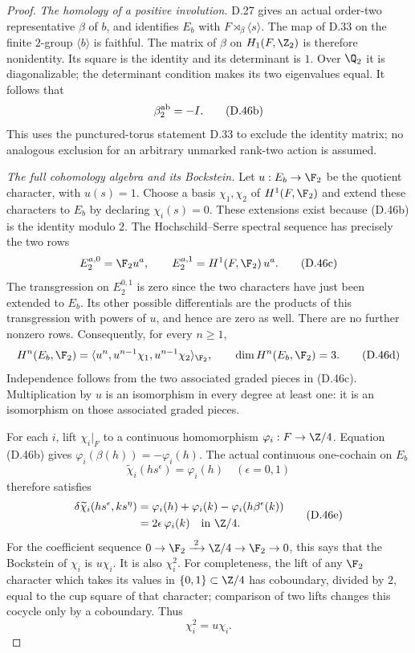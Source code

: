 \begin{proof}
\emph{The homology of a positive involution.}
D.27 gives an actual order-two representative $\beta$
of $b$, and identifies $E_b$ with
$F\rtimes_\beta\langle s\rangle$.
The map of D.33 on the finite $2$-group $\langle b\rangle$
is faithful.  The matrix of $\beta$ on
$H_1(F,\Z_2)$ is therefore nonidentity.
Its square is the identity and its determinant is $1$.
Over $\Q_2$ it is diagonalizable; the determinant
condition makes its two eigenvalues equal.
It follows that
\[
                    \beta^{\rm ab}_2=-I.               \tag{D.46b}
\]
This uses the punctured-torus statement D.33 to exclude
the identity matrix; no analogous exclusion for an
arbitrary unmarked rank-two action is assumed.

\emph{The full cohomology algebra and its Bockstein.}
Let $u:E_b\to\F_2$ be the quotient character, with
$u(s)=1$.  Choose a basis $\chi_1,\chi_2$ of
$H^1(F,\F_2)$ and extend these characters to $E_b$
by declaring $\chi_i(s)=0$.
These extensions exist because (D.46b) is the identity
modulo $2$.
The Hochschild--Serre spectral sequence has precisely
the two rows
\[
 E_2^{a,0}=\F_2 u^a,\qquad
 E_2^{a,1}=H^1(F,\F_2)\,u^a.                            \tag{D.46c}
\]
The transgression on $E_2^{0,1}$ is zero since the two
characters have just been extended to $E_b$.
Its other possible differentials are the products of
this transgression with powers of $u$, and hence are
zero as well.  There are no further nonzero rows.
Consequently, for every $n\geq1$,
\[
 H^n(E_b,\F_2)
   =\langle u^n,u^{n-1}\chi_1,u^{n-1}\chi_2\rangle_{\F_2},
 \qquad \dim H^n(E_b,\F_2)=3.                           \tag{D.46d}
\]
Independence follows from the two associated graded
pieces in (D.46c).
Multiplication by $u$ is an isomorphism in every
degree at least one: it is an isomorphism on those
associated graded pieces.

For each $i$, lift $\chi_i|_F$ to a continuous
homomorphism $\varphi_i:F\to\Z/4$.
Equation (D.46b) gives
$\varphi_i(\beta(h))=-\varphi_i(h)$.
The actual continuous one-cochain on $E_b$
\[
             \widetilde\chi_i(hs^\epsilon)=\varphi_i(h)
                      \quad(\epsilon=0,1)
\]
therefore satisfies
\[
 \begin{split}
 \delta\widetilde\chi_i(hs^\epsilon,ks^\eta)
  &=\varphi_i(h)+\varphi_i(k)
             -\varphi_i(h\beta^\epsilon(k))\\
  &=2\epsilon\,\varphi_i(k)
       \quad\text{in }\Z/4.
 \end{split}                                           \tag{D.46e}
\]
For the coefficient sequence
$0\to\F_2\xrightarrow{\;2\;}\Z/4\to\F_2\to0$,
this says that the Bockstein of $\chi_i$ is
$u\chi_i$.
It is also $\chi_i^2$.
For completeness, the lift of any $\F_2$ character
which takes its values in $\{0,1\}\subset\Z/4$
has coboundary, divided by $2$, equal to the cup
square of that character; comparison of two lifts
changes this cocycle only by a coboundary.
Thus
\[
                            \chi_i^2=u\chi_i.           \tag{D.46f}
\]


\end{proof}
